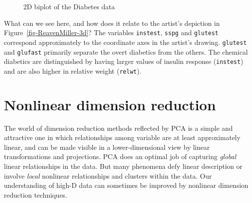 \documentclass[
  letterpaper,
  10pt,
  krantz2]{krantz}
\begin{document}
\begin{figure}[H]


\caption{\label{fig-diabetes-ggbiplot}2D biplot of the Diabetes data}

\end{figure}%

What can we see here, and how does it relate to the artist's depiction
in Figure~\ref{fig-ReavenMiller-3d}? The variables \texttt{instest},
\texttt{sspg} and \texttt{glutest} correspond approximately to the
coordinate axes in the artist's drawing. \texttt{glutest} and
\texttt{glufast} primarily separate the overt diabetics from the others.
The chemical diabetics are distinguished by having larger values of
insulin response (\texttt{instest}) and are also higher in relative
weight (\texttt{relwt}).

\section{Nonlinear dimension reduction}\label{sec-nonlinear}

The world of dimension reduction methods reflected by PCA is a simple
and attractive one in which relationships among variable are at least
approximately linear, and can be made visible in a lower-dimensional
view by linear transformations and projections. PCA does an optimal job
of capturing \emph{global} linear relationships in the data. But many
phenomena defy linear description or involve \emph{local} nonlinear
relationships and clusters within the data. Our understanding of high-D
data can sometimes be improved by nonlinear dimension reduction
techniques.
\end{document}
